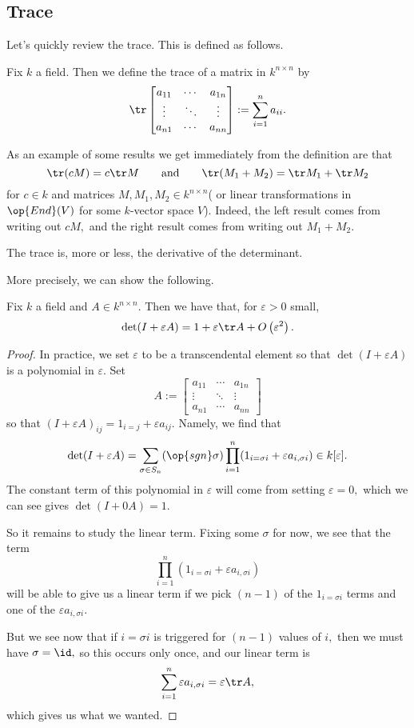 \subsection{Trace}
Let's quickly review the trace. This is defined as follows.
\begin{definition}[Trace]
	Fix $k$ a field. Then we define the trace of a matrix in $k^{n\times n}$ by
	\[\tr \begin{bmatrix}
		a_{11} & \cdots & a_{1n} \\
		\vdots & \ddots & \vdots \\
		a_{n1} & \cdots & a_{nn}
	\end{bmatrix}:=\sum_{i=1}^na_{ii}.\]
\end{definition}
\begin{remark}[Nir]
	As an example of some results we get immediately from the definition are that
	\[\tr(cM)=c\tr M\qquad\text{and}\qquad\tr(M_1+M_2)=\tr M_1+\tr M_2\]
	for $c\in k$ and matrices $M,M_1,M_2\in k^{n\times n}$( or linear transformations in $\op{End}(V)$ for some $k$-vector space $V$). Indeed, the left result comes from writing out $cM,$ and the right result comes from writing out $M_1+M_2.$
\end{remark}
\begin{idea}
	The trace is, more or less, the derivative of the determinant.
\end{idea}
More precisely, we can show the following.
\begin{exe} \label{exe:ddxdet}
	Fix $k$ a field and $A\in k^{n\times n}.$ Then we have that, for $\varepsilon>0$ small,
	\[\det(I+\varepsilon A)=1+\varepsilon\tr A+O\left(\varepsilon^2\right).\]
\end{exe}
\begin{proof}
	In practice, we set $\varepsilon$ to be a transcendental element so that $\det(I+\varepsilon A)$ is a polynomial in $\varepsilon.$ Set
	\[A:=\begin{bmatrix}
		a_{11} & \cdots & a_{1n} \\
		\vdots & \ddots & \vdots \\
		a_{n1} & \cdots & a_{nn}
	\end{bmatrix}\]
	so that $(I+\varepsilon A)_{ij}=1_{i=j}+\varepsilon a_{ij}.$ Namely, we find that
	\[\det(I+\varepsilon A)=\sum_{\sigma\in S_n}(\op{sgn}\sigma)\prod_{i=1}^n(1_{i=\sigma i}+\varepsilon a_{i,\sigma i})\in k[\varepsilon].\]
	The constant term of this polynomial in $\varepsilon$ will come from setting $\varepsilon=0,$ which we can see gives $\det(I+0A)=1.$

	So it remains to study the linear term. Fixing some $\sigma$ for now, we see that the term
	\[\prod_{i=1}^n(1_{i=\sigma i}+\varepsilon a_{i,\sigma i})\]
	will be able to give us a linear term if we pick $(n-1)$ of the $1_{i=\sigma i}$ terms and one of the $\varepsilon a_{i,\sigma i}.$
	
	But we see now that if $i=\sigma i$ is triggered for $(n-1)$ values of $i,$ then we must have $\sigma=\id,$ so this occurs only once, and our linear term is
	\[\sum_{i=1}^n\varepsilon a_{i,\sigma i}=\varepsilon\tr A,\]
	which gives us what we wanted.
\end{proof}
